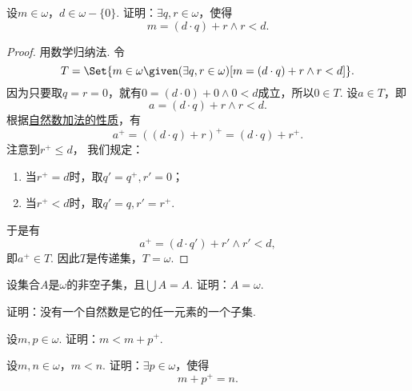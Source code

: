 \begin{example}
设\(m\in\omega\)，\(d\in\omega-\{0\}\).
证明：\(\exists q,r\in\omega\)，使得\begin{equation*}
	m=(d \cdot q)+r
	\land
	r<d.
\end{equation*}
\begin{proof}
用数学归纳法.
令\begin{equation*}
	T = \Set{
		m \in \omega
		\given
		(\exists q,r\in\omega)[
			m=(d \cdot q)+r
			\land
			r<d
		]
	}.
\end{equation*}
因为只要取\(q=r=0\)，就有\(0=(d\cdot0)+0\land0<d\)成立，所以\(0 \in T\).
设\(a \in T\)，即\begin{equation*}
	a = (d \cdot q) + r \land r < d.
\end{equation*}
根据\hyperref[equation:集合论.自然数的加法.性质2]{自然数加法的性质}，有\begin{equation*}
	a^+ = ((d \cdot q) + r)^+
	= (d \cdot q) + r^+.
\end{equation*}
注意到\(r^+ \leq d\)，
我们规定：\begin{enumerate}
	\item 当\(r^+=d\)时，取\(q'=q^+, r'=0\)；
	\item 当\(r^+<d\)时，取\(q'=q, r'=r^+\).
\end{enumerate}
于是有\begin{equation*}
	a^+ = (d \cdot q') + r'
	\land
	r' < d,
\end{equation*}
即\(a^+ \in T\).
因此\(T\)是传递集，\(T = \omega\).
\end{proof}
\end{example}

\begin{example}
设集合\(A\)是\(\omega\)的非空子集，且\(\bigcup A = A\).
证明：\(A=\omega\).
\end{example}

\begin{example}
证明：没有一个自然数是它的任一元素的一个子集.
\end{example}

\begin{example}
设\(m,p\in\omega\).
证明：\(m<m+p^+\).
\end{example}

\begin{example}
设\(m,n\in\omega\)，\(m<n\).
证明：\(\exists p\in\omega\)，使得\begin{equation*}
	m+p^+=n.
\end{equation*}
\end{example}

